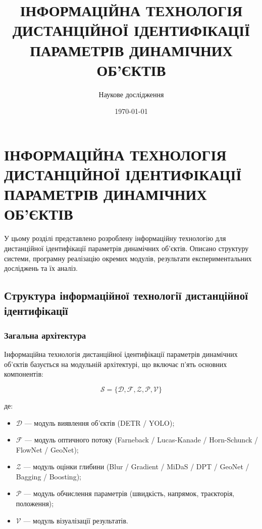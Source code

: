 \documentclass[14pt, a4paper]{extarticle}
\title{ІНФОРМАЦІЙНА ТЕХНОЛОГІЯ ДИСТАНЦІЙНОЇ ІДЕНТИФІКАЦІЇ ПАРАМЕТРІВ ДИНАМІЧНИХ ОБ'ЄКТІВ}
\author{Наукове дослідження}
\date{\today}
\numberwithin{equation}{section}
\begin{document}
\maketitle

\tableofcontents

\newpage

\section{ІНФОРМАЦІЙНА ТЕХНОЛОГІЯ ДИСТАНЦІЙНОЇ ІДЕНТИФІКАЦІЇ ПАРАМЕТРІВ ДИНАМІЧНИХ ОБ'ЄКТІВ}

У цьому розділі представлено розроблену інформаційну технологію для дистанційної ідентифікації параметрів динамічних об'єктів. Описано структуру системи, програмну реалізацію окремих модулів, результати експериментальних досліджень та їх аналіз.

\subsection{Структура інформаційної технології дистанційної ідентифікації}

\subsubsection{Загальна архітектура}

Інформаційна технологія дистанційної ідентифікації параметрів динамічних об'єктів базується на модульній архітектурі, що включає п'ять основних компонентів:

\begin{equation}
\boxed{\mathcal{S} = \{\mathcal{D}, \mathcal{F}, \mathcal{Z}, \mathcal{P}, \mathcal{V}\}} \tag{4.1}
\end{equation}

де:
\begin{itemize}
\item $\mathcal{D}$ — модуль виявлення об'єктів (DETR / YOLO);
\item $\mathcal{F}$ — модуль оптичного потоку (Farneback / Lucas-Kanade / Horn-Schunck / FlowNet / GeoNet);
\item $\mathcal{Z}$ — модуль оцінки глибини (Blur / Gradient / MiDaS / DPT / GeoNet / Bagging / Boosting);
\item $\mathcal{P}$ — модуль обчислення параметрів (швидкість, напрямок, траєкторія, положення);
\item $\mathcal{V}$ — модуль візуалізації результатів.
\end{itemize}
\end{document}
